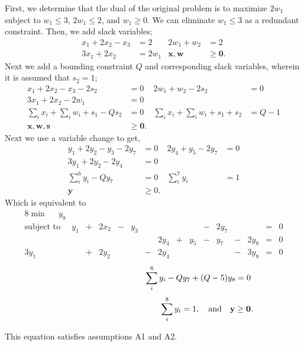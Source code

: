 \documentclass[12pt]{amsart}
\begin{document}
First, we determine that the dual of the original problem is
to maximize \(2w_1\) subject to \(w_1\leq3\), \(2w_1\leq2\), and \(w_1\geq0\).
We can eliminate \(w_1\leq3\) as a redundant constraint.
Then, we add slack variables;
\begin{align*}
	x_1 + 2x_2 - x_3 &= 2 & 2w_1 + w_2 &= 2 \\
	3x_1 + 2x_2 &= 2w_1 & \mathbf{x}, \mathbf{w} &\geq \mathbf{0}.
\end{align*}
Next we add a bounding constraint \(Q\) and corresponding slack variables, 
wherein it is assumed that \(s_2=1\);
\begin{align*}
	x_1 + 2x_2 - x_3 - 2s_2 &= 0 & 2w_1 + w_2 -2s_2 &= 0 \\
	3x_1 + 2x_2 - 2w_1 &= 0   \\
	\sum_{i}x_i + \sum_{i}w_i + s_1 - Qs_2 &= 0 & \sum_{i}x_i+\sum_{i}w_i + s_1 + s_2 &= Q-1 \\
	\mathbf{x}, \mathbf{w}, \mathbf{s} &\geq \mathbf{0}.
\end{align*}
Next we use a variable change to get,
\begin{align*}
	y_1 + 2y_2 - y_3 - 2y_7 &= 0 & 2y_4 + y_5 -2y_7 &= 0 \\
	3y_1 + 2y_2 - 2y_4 &= 0   \\
	\sum_i^6y_i - Qy_7 &= 0 & \sum_{i}^7y_i &= 1 \\
	\mathbf{y} &\geq 0.
\end{align*}
Which is equivalent to 
\begin{alignat*}{8}
	\min\quad\,\ y_8 \\
	\text{subject to}\quad\,\ 
	 y_1& {}+{} & 2x_2& {}-{} & y_3 &  { }  &  {}  &  { }  & {}  & {}-{} & 2y_7 &  { }  & {}  & {}={} & 0 \\
	 {} &  { }  &  {} &  { }  & {}  &  { }  & 2y_4 & {}+{} & y_5 & {}-{} & y_7  & {}-{} & 2y_8& {}={} & 0 \\
	3y_1& {}+{} & 2y_2&  { }  & {}  & {}-{} & 2y_4 &  { }  & {}  &  { }  & {}   & {}-{} & 3y_8& {}={} & 0 
\end{alignat*}
\[ \hspace{25ex} \sum_i^6y_i - Qy_7 + (Q-5)y_8  {}={} 0 \]
\[ \hspace{30ex} \sum_i^8y_i = 1,\quad \text{and} \quad \mathbf{y} \geq \mathbf{0} .\]

This equation satisfies assumptions A1 and A2.
\end{document}
